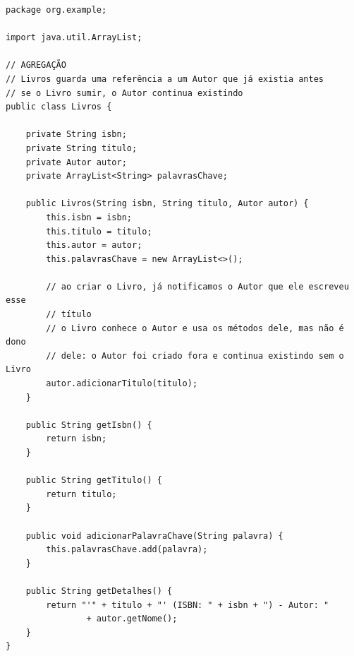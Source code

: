 \begin{lstlisting}[style=java, caption={Exemplo de Aplicação de POO em Java: \texttt{Livros.java}}]
package org.example;

import java.util.ArrayList;

// AGREGAÇÃO
// Livros guarda uma referência a um Autor que já existia antes
// se o Livro sumir, o Autor continua existindo
public class Livros {

    private String isbn;
    private String titulo;
    private Autor autor;
    private ArrayList<String> palavrasChave;

    public Livros(String isbn, String titulo, Autor autor) {
        this.isbn = isbn;
        this.titulo = titulo;
        this.autor = autor;
        this.palavrasChave = new ArrayList<>();

        // ao criar o Livro, já notificamos o Autor que ele escreveu esse
        // título
        // o Livro conhece o Autor e usa os métodos dele, mas não é dono
        // dele: o Autor foi criado fora e continua existindo sem o Livro
        autor.adicionarTitulo(titulo);
    }

    public String getIsbn() {
        return isbn;
    }

    public String getTitulo() {
        return titulo;
    }

    public void adicionarPalavraChave(String palavra) {
        this.palavrasChave.add(palavra);
    }

    public String getDetalhes() {
        return "'" + titulo + "' (ISBN: " + isbn + ") - Autor: "
                + autor.getNome();
    }
}
\end{lstlisting}

